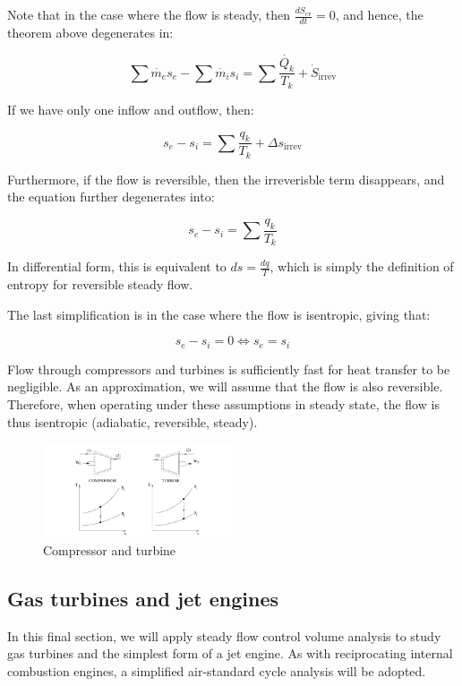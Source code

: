 \documentclass{article}
\begin{document}
Note that in the case where the flow is steady, then $\frac{dS_\text{cv}}{dt} = 0$, and hence, the theorem above degenerates in:

\[ \sum \dot{m_e}s_e - \sum \dot{m_i}s_i = \sum \frac{\dot{Q_k}}{T_k} + \dot{S}_\text{irrev} \]

If we have only one inflow and outflow, then:

\[ s_e - s_i = \sum \frac{q_k}{T_k} + \Delta s_\text{irrev} \]

Furthermore, if the flow is reversible, then the irreverisble term disappears, and the equation further degenerates into:

\[ s_e - s_i = \sum \frac{q_k}{T_k} \]

In differential form, this is equivalent to $ds = \frac{dq}{T}$, which is simply the definition of entropy for reversible steady flow.

The last simplification is in the case where the flow is isentropic, giving that:

\[ s_e - s_i = 0 \iff s_e = s_i \]

\begin{proposition}
    Flow through compressors and turbines is sufficiently fast for heat transfer to be negligible. As an approximation, we will assume that the flow is also reversible. Therefore, when operating under these assumptions in steady state, the flow is thus isentropic (adiabatic, reversible, steady).
\end{proposition}

\begin{figure}[h]
    \centering
    \includegraphics[width = 0.5\textwidth]{images/Screenshot 2024-04-03 212806.png}
    \caption{Compressor and turbine}
    \label{fig:enter-label}
\end{figure}

\newpage

\subsection{Gas turbines and jet engines}

In this final section, we will apply steady flow control volume analysis to study gas turbines and the simplest form of a jet engine. As with reciprocating internal combustion engines, a simplified air-standard cycle analysis will be adopted.
\end{document}
